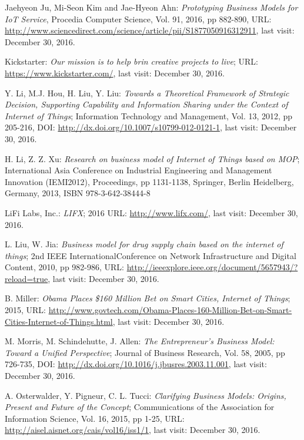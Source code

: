 \begin{thebibliography}{99}
 	 Jaehyeon Ju, Mi-Seon Kim and Jae-Hyeon Ahn: \emph{Prototyping Business Models for IoT Service}, Procedia Computer Science, Vol. 91, 2016, pp 882-890, URL: \url{http://www.sciencedirect.com/science/article/pii/S1877050916312911}, last visit: December 30, 2016.
 	
 	 Kickstarter: \emph{Our mission is to help brin creative projects to live}; URL: \url{https://www.kickstarter.com/}, last visit: December 30, 2016.
	
	 Y. Li, M.J. Hou, H. Liu, Y. Liu: \emph{Towards a Theoretical Framework of Strategic Decision, Supporting Capability and Information Sharing under the Context of Internet of Things}; Information Technology and Management, Vol. 13, 2012, pp 205-216, DOI: \url{http://dx.doi.org/10.1007/s10799-012-0121-1}, last visit: December 30, 2016.
	
	 H. Li, Z. Z. Xu: \emph{Research on business model of Internet of Things based on MOP}; International Asia Conference on Industrial Engineering and Management Innovation (IEMI2012), Proceedings, pp 1131-1138, Springer, Berlin Heidelberg, Germany, 2013, ISBN 978-3-642-38444-8 

	 LiFi Labs, Inc.: \emph{LIFX}; 2016 URL: \url{http://www.lifx.com/}, last visit: December 30, 2016.

	 L. Liu, W. Jia: \emph{Business model for drug supply chain based on the internet of things}; 2nd IEEE InternationalConference on Network Infrastructure and Digital Content, 2010, pp 982-986, URL: \url{http://ieeexplore.ieee.org/document/5657943/?reload=true}, last visit: December 30, 2016.

	 B. Miller: \emph{Obama Places \$160 Million Bet on Smart Cities, Internet of Things}; 2015, URL: \url{http://www.govtech.com/Obama-Places-160-Million-Bet-on-Smart-Cities-Internet-of-Things.html}, last visit: December 30, 2016.

	 M. Morris, M. Schindehutte, J. Allen: \emph{The Entrepreneur's Business Model: Toward a Unified Perspective}; Journal of Business Research, Vol. 58, 2005, pp 726-735, DOI: \url{http://dx.doi.org/10.1016/j.jbusres.2003.11.001}, last visit: December 30, 2016.

	 A. Osterwalder, Y. Pigneur, C. L. Tucci: \emph{Clarifying Business Models: Origins, Present and Future of the Concept}; Communications of the Association for Information Science, Vol. 16, 2015, pp 1-25, URL: \url{http://aisel.aisnet.org/cais/vol16/iss1/1}, last visit: December 30, 2016.


\end{thebibliography}
